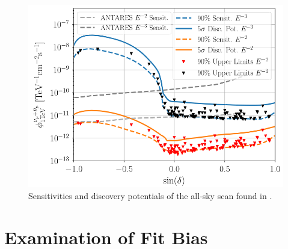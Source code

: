 \begin{figure}
    \centering
    \includegraphics[width=\linewidth]{Plots/appendix/10_year_all_sky_results.png}
    \caption{Sensitivities and discovery potentials of the all-sky scan found in \cite{all_sky_paper}.}
    \label{fig:all_sky_plot}
\end{figure}

\section{Examination of Fit Bias}

